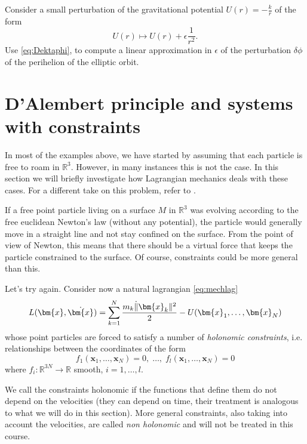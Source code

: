 \documentclass[english,fontsize=11pt,paper=a5,oneside]{scrbook}
\newcommand{\R}{\mathbb{R}}
\newcommand{\bx}{\bm{x}}
\theoremstyle{definition}
\newenvironment{remark}
  {\pushQED{\qed}\renewcommand{\qedsymbol}{$\lozenge$}\remarkx}
  {\popQED\endremarkx}
\newenvironment{exercise}
  {\pushQED{\qed}\renewcommand{\qedsymbol}{$\maltese$}\exercisex}
  {\popQED\endexercisex}
\begin{document}
\begin{exercise}
    Consider a small perturbation of the gravitational potential $U(r) = -\frac kr$ of the form
    \begin{equation}
        U(r) \mapsto U(r) + \epsilon \frac 1{r^2}.
    \end{equation}
    Use \eqref{eq:Dektaphi}, to compute a linear approximation in $\epsilon$ of the perturbation $\delta \phi$ of the perihelion of the elliptic orbit.
\end{exercise}

\section{D'Alembert principle and systems with constraints}\label{sec:LagrangeConstraints}

In most of the examples above, we have started by assuming that each particle is free to roam in $\R^3$.
However, in many instances this is not the case.
In this section we will briefly investigate how Lagrangian mechanics deals with these cases. For a different take on this problem, refer to \cite[Chapter 21]{book:arnold}.

If a free point particle living on a surface $M$ in $\R^3$ was evolving according to the free euclidean Newton's law (without any potential), the particle would generally move in a straight line and not stay confined on the surface.
From the point of view of Newton, this means that there should be a virtual force that keeps the particle constrained to the surface. Of course, constraints could be more general than this.

Let's try again. Consider now a natural lagrangian \eqref{eq:mechlag}
\begin{equation}
    L(\bx, \dot\bx) = \sum_{k=1}^N \frac{m_k \dot \|\bx_k\|^2}{2} - U(\bx_1, \ldots, \bx_N)
\end{equation}
whose point particles are forced to satisfy a number of \emph{holonomic constraints}, i.e. relationships between the coordinates of the form
\begin{equation}\label{eq:holonomic}
    f_1(\bx_1, \ldots,\bx_N) = 0, \;\ldots,\; f_l(\bx_1, \ldots,\bx_N) = 0
\end{equation}
where $f_i : \R^{3N}\to\R$ smooth, $i=1,\ldots,l$.

\begin{remark}
    We call the constraints holonomic if the functions that define them do not depend on the velocities (they can depend on time, their treatment is analogous to what we will do in this section). More general constraints, also taking into account the velocities, are called \emph{non holonomic} and will not be treated in this course.
\end{remark}
\end{document}
